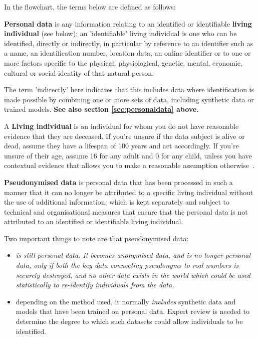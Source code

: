\documentclass[10pt,a4paper,twocolumn]{article}
\begin{document}
In the flowchart, the terms below are defined as follows:

\textbf{Personal data} is any information relating to an identified or identifiable \textbf{living individual} (see below); an 'identifiable' living individual is one who can be identified, directly or indirectly, in particular by reference to an identifier such as a name, an identification number, location data, an online identifier or to one or more factors specific to the physical, physiological, genetic, mental, economic, cultural or social identity of that natural person.

The term 'indirectly' here indicates that this includes data where identification is made possible by combining one or more sets of data, including synthetic data or trained models.
\textbf{See also section \ref{sec:personaldata} above.}

A \textbf{Living individual} is an individual for whom you do not have reasonable evidence that they are deceased. If you’re unsure if the data subject is alive or dead, assume they have a lifespan of 100 years and act accordingly. If you’re unsure of their age, assume 16 for any adult and 0 for any child, unless you have contextual evidence that allows you to make a reasonable assumption otherwise~\cite{nationalarchives2018}. 

\textbf{Pseudonymised data} is personal data that has been processed in such a manner that it can no longer be attributed to a specific living individual without the use of additional information, which is kept separately and subject to technical and organisational measures that ensure that the personal data is not attributed to an identified or identifiable living individual. 

Two important things to note are that pseudonymised data:
\begin{itemize}
    \item \textit{is still personal data. It becomes anonymised data, and is no longer personal data, only if \emph{both} the key data connecting pseudonyms to real numbers is securely destroyed, \emph{and} no other data exists in the world which could be used statistically to re-identify individuals from the data.}
    \item depending on the method used, it normally \textit{includes} synthetic data and models that have been trained on personal data. Expert review is needed to determine the degree to which such datasets could allow individuals to be identified.
\end{itemize}
\end{document}
